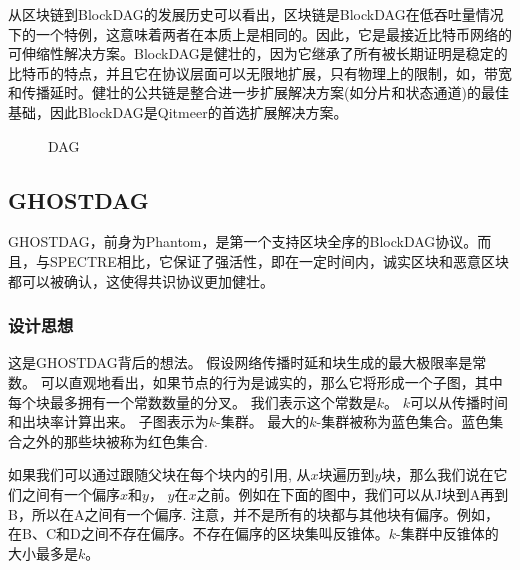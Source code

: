 \documentclass[a4paper,11pt]{article}
\begin{document}
从区块链到BlockDAG的发展历史可以看出，区块链是BlockDAG在低吞吐量情况下的一个特例，这意味着两者在本质上是相同的。因此，它是最接近比特币网络的可伸缩性解决方案。BlockDAG是健壮的，因为它继承了所有被长期证明是稳定的比特币的特点，并且它在协议层面可以无限地扩展，只有物理上的限制，如，带宽和传播延时。健壮的公共链是整合进一步扩展解决方案(如分片和状态通道)的最佳基础，因此BlockDAG是Qitmeer的首选扩展解决方案。


\begin{figure}[hbt]
	\centerline{%
	}
\caption{DAG}
\end{figure}

\subsection{GHOSTDAG}

GHOSTDAG，前身为Phantom，是第一个支持区块全序的BlockDAG协议。而且，与SPECTRE相比，它保证了强活性，即在一定时间内，诚实区块和恶意区块都可以被确认，这使得共识协议更加健壮。

\subsubsection{设计思想}

这是GHOSTDAG背后的想法。
假设网络传播时延和块生成的最大极限率是常数。
可以直观地看出，如果节点的行为是诚实的，那么它将形成一个子图，其中每个块最多拥有一个常数数量的分叉。
我们表示这个常数是$k$。
$k$可以从传播时间和出块率计算出来。
子图表示为$k$-集群。
最大的$k$-集群被称为蓝色集合。蓝色集合之外的那些块被称为红色集合.


如果我们可以通过跟随父块在每个块内的引用, 从$x$块遍历到$y$块，那么我们说在它们之间有一个偏序$x$和$y$， $y$在$x$之前。例如在下面的图中，我们可以从J块到A再到B，所以在A之间有一个偏序. 注意，并不是所有的块都与其他块有偏序。例如，在B、C和D之间不存在偏序。不存在偏序的区块集叫反锥体。$k$-集群中反锥体的大小最多是$k$。
\end{document}
